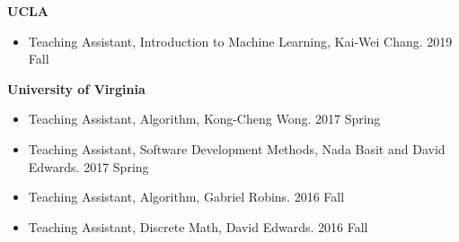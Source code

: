 \documentclass[11pt, a4paper]{article}
\newcommand{\hr}{\hrule\vspace{0.5em}}
\begin{document}
\textbf{UCLA}
\begin{itemize}
	\item Teaching Assistant, Introduction to Machine Learning, Kai-Wei Chang. \hfill 2019 Fall
\end{itemize}
\textbf{University of Virginia}
\begin{itemize}
\item Teaching Assistant, Algorithm, Kong-Cheng Wong. \hfill 2017 Spring
\item Teaching Assistant, Software Development Methods, Nada Basit and David Edwards. \hspace*{\fill} 2017 Spring 
\item Teaching Assistant, Algorithm, Gabriel Robins. \hfill  2016 Fall
\item Teaching Assistant, Discrete Math, David Edwards. \hfill 2016 Fall
\end{itemize}

\end{document}
